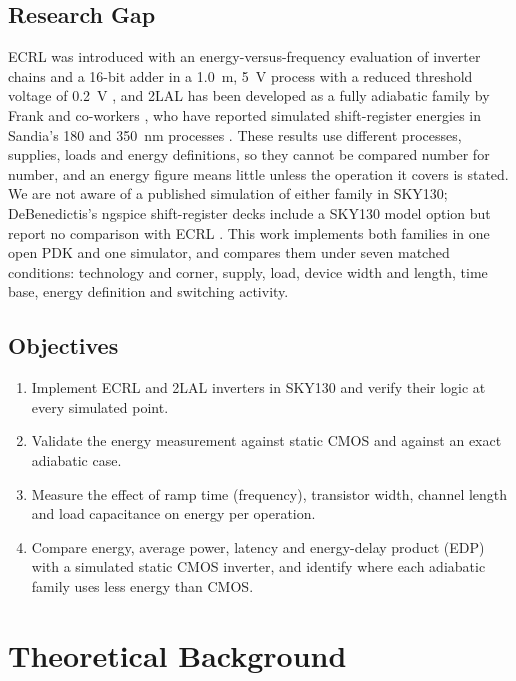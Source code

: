 \documentclass[conference]{IEEEtran}
\begin{document}
\subsection{Research Gap}
ECRL was introduced with an energy-versus-frequency evaluation of inverter
chains and a 16-bit adder in a 1.0~\textmu m, 5~V process with a reduced
threshold voltage of 0.2~V \cite{moon1996}, and 2LAL has been developed as a fully adiabatic family by
Frank and co-workers \cite{frank2003mistakes,frank2020icrc}, who have
reported simulated shift-register energies in Sandia's 180 and 350~nm
processes \cite{frank2020talk}. These results use
different processes, supplies, loads and energy definitions, so they cannot be
compared number for number, and an energy figure means little unless the
operation it covers is stated. We are not aware of a published simulation of
either family in SKY130; DeBenedictis's ngspice shift-register decks include a
SKY130 model option but report no comparison with ECRL \cite{debenedictis4lc}.
This work implements both families in one open PDK and one simulator, and
compares them under seven matched conditions: technology and corner, supply,
load, device width and length, time base, energy definition and switching
activity.

\subsection{Objectives}
\begin{enumerate}
  \item Implement ECRL and 2LAL inverters in SKY130 and verify their logic
        at every simulated point.
  \item Validate the energy measurement against static CMOS and against an
        exact adiabatic case.
  \item Measure the effect of ramp time (frequency), transistor width,
        channel length and load capacitance on energy per operation.
  \item Compare energy, average power, latency and energy-delay product (EDP)
        with a simulated static CMOS inverter, and identify where each
        adiabatic family uses less energy than CMOS.
\end{enumerate}

\section{Theoretical Background}
\label{sec:theory}
\end{document}
